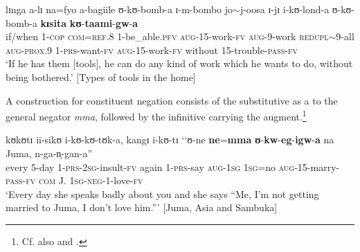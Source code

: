 \begin{exe}
\ex \label{exKisita} \gll lɪnga a-lɪ na=fyo a-bagiile ʊ-kʊ-bomb-a ɪ-m-bombo jo$\sim$j-oosa ɪ-jɪ i-kʊ-lond-a ʊ-kʊ-bomb-a \textbf{kɪsita} \textbf{kʊ}-\textbf{taami}-\textbf{gw}-\textbf{a}\\
if/when 1-\textsc{cop} \textsc{com}=\textsc{ref.8} 1-be\_able.\textsc{pfv} \textsc{aug}-15-work-\textsc{fv} \textsc{aug}-9-work \textsc{redupl}$\sim$9-all \textsc{aug}-\textsc{prox.9} 1-\textsc{prs}-want-\textsc{fv} \textsc{aug}-15-work-\textsc{fv} without 15-trouble-\textsc{pass}-\textsc{fv}\\
\glt \lq If he has them [tools], he can do any kind of work which he wants to do, without being bothered.' [Types of tools in the home]
\end{exe}

A construction for constituent negation consists of the substitutive as a  to the general negator \textit{mma}, followed by the infinitive carrying the augment.\footnote{Cf. also \citet[69]{SchumannK1899} and \citet[84f]{EndemannC1914}.}
\begin{exe}
\ex \label{exRefMma1}\gll kʊkʊtɪ ii-sikʊ i-kʊ-kʊ-tʊk-a, kangɪ i-kʊ-tɪ \textup{\lq\lq}ʊ-ne \textbf{ne}=\textbf{mma} \textbf{ʊ}-\textbf{kw}-\textbf{eg}-\textbf{igw}-\textbf{a} na Juma, n-ga-n̩-gan-a\textup{''}\\
every 5-day 1-\textsc{prs}-\textsc{2sg}-insult-\textsc{fv} again 1-\textsc{prs}-say \phantom{\lq\lq}\textsc{aug}-\textsc{1sg} \textsc{1sg}=no \textsc{aug}-15-marry-\textsc{pass}-\textsc{fv} \textsc{com} J. \textsc{1sg}-\textsc{neg}-1-love-\textsc{fv}\\
\glt `Every day she speaks badly about you and she says ``Me, I'm not getting married to Juma, I don't love him.''{}' [Juma, Asia and Sambuka]
\end{exe}

